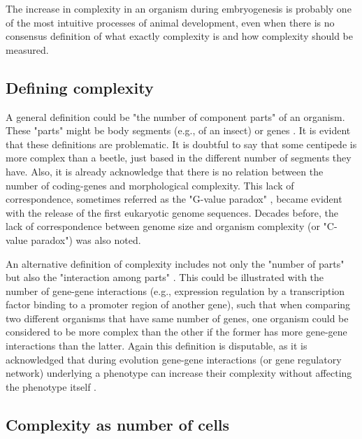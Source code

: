 The increase in complexity in an organism during embryogenesis is probably one of the most intuitive processes of animal development, 
even when there is no consensus definition of what exactly complexity is and how complexity should be measured.

\subsection{Defining complexity}
A general definition could be "the number of component parts" of an organism.
These "parts" might be body segments (e.g., of an insect) or genes
	\citep{Arthur2010}.
It is evident that these definitions are problematic.
It is doubtful to say that some centipede is more complex than a beetle, just based in the different number of segments they have.
Also, it is already acknowledge that there is no relation between the number of coding-genes and morphological complexity.
This lack of correspondence, sometimes referred as the "G-value paradox"
	\citep{Hahn2002},
became evident with the release of the first eukaryotic genome sequences.
Decades before, the lack of correspondence between genome size and organism complexity (or "C-value paradox") was also noted.


An alternative definition of complexity includes not only the "number of parts" but also the "interaction among parts" 
	\citep{Arthur2010}.
This could be illustrated with the number of gene-gene interactions (e.g., expression regulation by a transcription factor binding to a promoter region of another gene),
such that when comparing two different organisms that have same number of genes, 
one organism could be considered to be more complex than the other if the former has more gene-gene interactions than the latter.
Again this definition is disputable, as it is acknowledged that during evolution gene-gene interactions (or gene regulatory network) underlying a phenotype
can increase their complexity without affecting the phenotype itself
	\citep{Muller1999,True2001,Salazar-Ciudad2009}.

\subsection{Complexity as number of cells}

